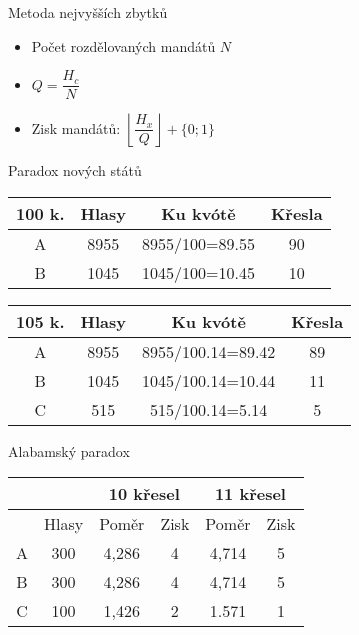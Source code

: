 \documentclass[17pt]{beamer}
\begin{document}
\begin{frame}{Metoda nejvyšších zbytků}
\begin{itemize}
\item Počet rozdělovaných mandátů $N$
\item $Q=\dfrac{H_{c}}{N}$
\item Zisk mandátů: $\left\lfloor\dfrac{H_{x}}{Q}\right\rfloor+\{0;1\}$
\end{itemize}
\end{frame}

\begin{frame}{Paradox nových států}
\begin{center}
\begin{tabular}{|c|c|c|c|}
\hline 
100 k. & Hlasy & Ku kvótě & Křesla \\ 
\hline 
A & 8955 & \hspace{0.35cm}8955/100=89.55\hspace{0.35cm} & 90 \\ 
\hline 
B & 1045 & 1045/100=10.45 & 10 \\ 
\hline 
\end{tabular}
\end{center} 
\begin{center}
\begin{tabular}{|c|c|c|c|}
\hline 
105 k. & Hlasy & Ku kvótě & Křesla \\ 
\hline 
A & 8955 & 8955/100.14=89.42 & 89 \\ 
\hline 
B & 1045 & 1045/100.14=10.44 & 11 \\ 
\hline 
C & 515 & 515/100.14=5.14 & 5 \\ 
\hline 
\end{tabular} 
\end{center}
\end{frame}

\begin{frame}{Alabamský paradox}
\begin{center}
\begin{tabular}{|c|c|c|c|c|c|}
\hline 
 &  & \multicolumn{2}{c|}{10 křesel} & \multicolumn{2}{c|}{11 křesel} \\ 
\hline 
 & Hlasy & Poměr & Zisk & Poměr & Zisk \\ 
\hline 
A & 300 & 4,286 & 4 & 4,714 & 5 \\ 
\hline 
B & 300 & 4,286 & 4 & 4,714 & 5 \\ 
\hline 
C & 100 & 1,426 & 2 & 1.571 & 1 \\ 
\hline
\end{tabular} 
\end{center}
\end{frame}
\end{document}
